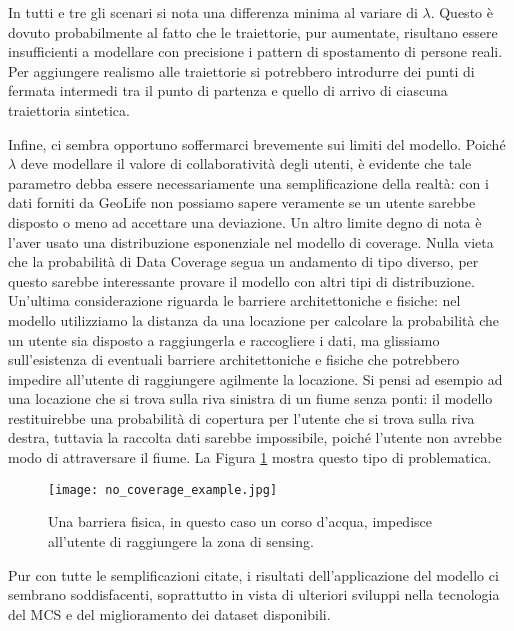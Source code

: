 In tutti e tre gli scenari si nota una differenza minima al variare di $\lambda$. Questo è dovuto probabilmente al fatto che le traiettorie, pur aumentate, risultano essere insufficienti a modellare con precisione i pattern di spostamento di persone reali. Per aggiungere realismo alle traiettorie si potrebbero introdurre dei punti di fermata intermedi tra il punto di partenza e quello di arrivo di ciascuna traiettoria sintetica.

Infine, ci sembra opportuno soffermarci brevemente sui limiti del modello.
Poiché $\lambda$ deve modellare il valore di collaboratività degli utenti, è evidente che tale parametro debba essere necessariamente una semplificazione della realtà: con i dati forniti da GeoLife \cite{zheng1, zheng2, zheng3} non possiamo sapere veramente se un utente sarebbe disposto o meno ad accettare una deviazione.
Un altro limite degno di nota è l'aver usato una distribuzione esponenziale nel modello di coverage. Nulla vieta che la probabilità di Data Coverage segua un andamento di tipo diverso, per questo sarebbe interessante provare il modello con altri tipi di distribuzione.
Un'ultima considerazione riguarda le barriere architettoniche e fisiche: nel modello utilizziamo la distanza da una locazione per calcolare la probabilità che un utente sia disposto a raggiungerla e raccogliere i dati, ma  glissiamo sull'esistenza di eventuali barriere architettoniche e fisiche che potrebbero impedire all'utente di raggiungere agilmente la locazione.
Si pensi ad esempio ad una locazione che si trova sulla riva sinistra di un fiume senza ponti: il modello restituirebbe una probabilità di copertura per l'utente che si trova sulla riva destra, tuttavia la raccolta dati sarebbe impossibile, poiché l'utente non avrebbe modo di attraversare il fiume. La Figura \ref{fig:no_coverage_example} mostra questo tipo di problematica.

\begin{figure}
	\centering 
	\texttt{[image: no\_coverage\_example.jpg]}
	\caption[Esempio di barriera fisica]{Una barriera fisica, in questo caso un corso d'acqua, impedisce all'utente di raggiungere la zona di sensing.}
	\label{fig:no_coverage_example}
\end{figure}

Pur con tutte le semplificazioni citate, i risultati dell'applicazione del modello ci sembrano soddisfacenti, soprattutto in vista di ulteriori sviluppi nella tecnologia del MCS e del miglioramento dei dataset disponibili.